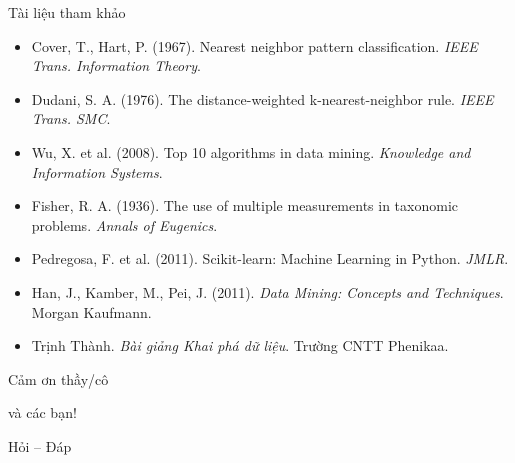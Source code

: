 \documentclass[aspectratio=169,10pt]{beamer}
\begin{document}
\begin{frame}{Tài liệu tham khảo}
\footnotesize
\begin{itemize}\setlength\itemsep{0.35em}
  \item Cover, T., Hart, P. (1967). Nearest neighbor pattern classification. \textit{IEEE Trans. Information Theory}.
  \item Dudani, S. A. (1976). The distance-weighted k-nearest-neighbor rule. \textit{IEEE Trans. SMC}.
  \item Wu, X. et al. (2008). Top 10 algorithms in data mining. \textit{Knowledge and Information Systems}.
  \item Fisher, R. A. (1936). The use of multiple measurements in taxonomic problems. \textit{Annals of Eugenics}.
  \item Pedregosa, F. et al. (2011). Scikit-learn: Machine Learning in Python. \textit{JMLR}.
  \item Han, J., Kamber, M., Pei, J. (2011). \textit{Data Mining: Concepts and Techniques}. Morgan Kaufmann.
  \item Trịnh Thành. \textit{Bài giảng Khai phá dữ liệu}. Trường CNTT Phenikaa.
\end{itemize}
\end{frame}

\begin{frame}[plain]
  \vspace*{2.2cm}
  \begin{flushright}
    {\titlefont\color{tieude}\fontsize{30}{36}\selectfont Cảm ơn thầy/cô\par và các bạn!\par}
    \vspace{0.4cm}
    {\large\color{gray} Hỏi -- Đáp\par}
  \end{flushright}
\end{frame}
\end{document}
